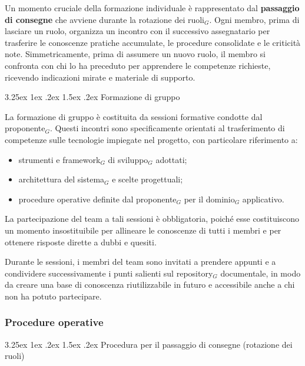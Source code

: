 \documentclass[a4paper, 10pt]{article}
\makeatletter
\renewcommand\paragraph{\@startsection{paragraph}{4}{\z@}%
  {3.25ex \@plus1ex \@minus .2ex}%
  {1.5ex \@plus .2ex}%
  {\normalfont\normalsize\bfseries}}
\makeatother
\begin{document}
Un momento cruciale della formazione individuale è rappresentato dal \textbf{passaggio di consegne} che avviene durante la rotazione dei ruoli$_G$. Ogni membro, prima di lasciare un ruolo, organizza un incontro con il successivo assegnatario per trasferire le conoscenze pratiche accumulate, le procedure consolidate e le criticità note. Simmetricamente, prima di assumere un nuovo ruolo, il membro si confronta con chi lo ha preceduto per apprendere le competenze richieste, ricevendo indicazioni mirate e materiale di supporto.

\paragraph{Formazione di gruppo}

La formazione di gruppo è costituita da sessioni formative condotte dal proponente$_G$. Questi incontri sono specificamente orientati al trasferimento di competenze sulle tecnologie impiegate nel progetto, con particolare riferimento a:
\begin{itemize}
    \item strumenti e framework$_G$ di sviluppo$_G$ adottati;
    \item architettura del sistema$_G$ e scelte progettuali;
    \item procedure operative definite dal proponente$_G$ per il dominio$_G$ applicativo.
\end{itemize}

La partecipazione del team a tali sessioni è obbligatoria, poiché esse costituiscono un momento insostituibile per allineare le conoscenze di tutti i membri e per ottenere risposte dirette a dubbi e quesiti.

Durante le sessioni, i membri del team sono invitati a prendere appunti e a condividere successivamente i punti salienti sul repository$_G$ documentale, in modo da creare una base di conoscenza riutilizzabile in futuro e accessibile anche a chi non ha potuto partecipare.

\subsubsection{Procedure operative}
\label{subsubsec:procedure_formazione}

\paragraph{Procedura per il passaggio di consegne (rotazione dei ruoli)}
\end{document}
